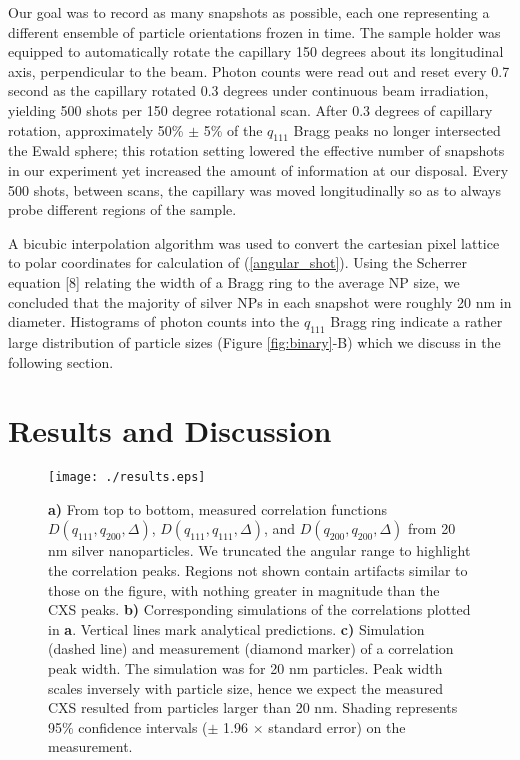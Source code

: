 \documentclass [11pt,fleqn]{article}
\begin{document}
Our goal was to record as many snapshots as possible, each one representing a different ensemble of particle orientations frozen in time. The sample holder was equipped to automatically rotate the capillary 150 degrees about its longitudinal axis, perpendicular to the beam. Photon counts were read out and reset every 0.7 second as the capillary rotated 0.3 degrees under continuous beam irradiation, yielding 500 shots per 150 degree rotational scan. After 0.3 degrees of capillary rotation, approximately 50\% $\pm$ 5\% of the $q_{111}$ Bragg peaks no longer intersected the Ewald sphere; this rotation setting lowered the effective number of snapshots in our experiment yet increased the amount of information at our disposal. Every 500 shots, between scans, the capillary was moved longitudinally so as to always probe different regions of the sample.

A bicubic interpolation algorithm was used to convert the cartesian pixel lattice to polar coordinates for calculation of (\ref{angular_shot}). Using the Scherrer equation [8] relating the width of a Bragg ring to the average NP size, we concluded that the majority of silver NPs in each snapshot were roughly 20 nm in diameter. Histograms of photon counts into the $q_{111}$ Bragg ring indicate a rather large distribution of particle sizes (Figure \ref{fig:binary}-B) which we discuss in the following section.

\section{Results and Discussion}


\begin{figure}
\begin{center}
\texttt{[image: ./results.eps]}
\end{center}
\caption{ {\bf a)} From top to bottom, measured correlation functions $D (q_{111},q_{200}, \Delta  )$, $D (q_{111},q_{111}, \Delta  )$, and $D (q_{200},q_{200}, \Delta  )$ from 20 nm silver nanoparticles. We truncated the angular range to highlight the correlation peaks. Regions not shown contain artifacts similar to those on the figure, with nothing greater in magnitude than the CXS peaks. {\bf b)} Corresponding simulations of the correlations plotted in {\bf a}. Vertical lines mark analytical predictions. {\bf c)} Simulation (dashed line) and measurement (diamond marker) of a correlation peak width. The simulation was for 20 nm particles. Peak width scales inversely with particle size, hence we expect the measured CXS resulted from particles larger than 20 nm. Shading represents 95\% confidence intervals ($\pm$ 1.96 $\times $ standard error) on the measurement. }
\label{fig:results}
\end{figure}
\end{document}
